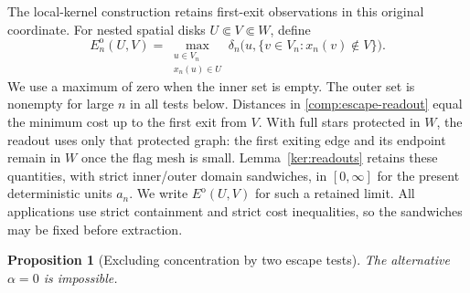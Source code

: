 \documentclass[11pt]{article}
\numberwithin{equation}{section}
\newtheorem{proposition}[theorem]{Proposition}
\theoremstyle{definition}
\theoremstyle{remark}
\newcommand{\1}{\mathbf 1}
\begin{document}
The local-kernel construction retains first-exit observations in
this original coordinate.  For nested spatial disks
$U\Subset V\Subset W$, define
\begin{equation}
 \label{comp:escape-readout}
 E_n^{\mathrm o}(U,V)=
 \max_{\substack{u\in V_n\\x_n(u)\in U}}
 \delta_n\bigl(u,\{v\in V_n:x_n(v)\notin V\}\bigr).
\end{equation}
We use a maximum of zero when the inner set is empty.  The
outer set is nonempty for large $n$ in all tests below.  Distances
in \eqref{comp:escape-readout} equal the minimum cost up to the
first exit from $V$.  With full stars protected in $W$, the
readout uses only that protected graph: the first exiting edge
and its endpoint remain in $W$ once the flag mesh is small.
Lemma~\ref{ker:readouts} retains these quantities, with strict
inner/outer domain sandwiches, in $[0,\infty]$ for the present
deterministic units $a_n$.  We write $E^{\mathrm o}(U,V)$ for such a
retained limit.  All applications use strict containment and strict cost
inequalities, so the sandwiches may be fixed before extraction.

\begin{proposition}[Excluding concentration by two escape tests]
\label{comp:no-concentration}
The alternative $\alpha=0$ is impossible.
\end{proposition}
\end{document}
